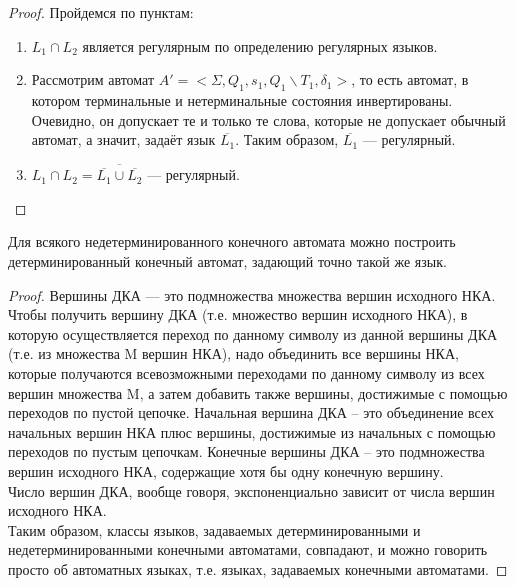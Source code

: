     \begin{proof}
        Пройдемся по пунктам:
        \begin{enumerate}
            \item $L_1 \cap L_2$ является регулярным по определению регулярных языков.
            \item Рассмотрим автомат $A' = <\Sigma, Q_1, s_1,Q_1 \backslash T_1,\delta_1>$, то есть автомат, в котором терминальные и нетерминальные состояния инвертированы. Очевидно, он допускает те и только те слова, которые не допускает обычный автомат, а значит, задаёт язык $\overline{L_1}$. Таким образом, $\overline{L_1}$ --- регулярный.
            \item $L_1 \cap L_2 = \overline{\overline{L_1} \cup \overline{L_2}}$ --- регулярный.
        \end{enumerate}
    \end{proof}


    \begin{Thm}
        Для всякого недетерминированного конечного автомата можно построить детерминированный конечный автомат, задающий точно такой же язык. 
    \end{Thm}
    \begin{proof}
        Вершины ДКА --- это подмножества множества вершин исходного НКА. Чтобы получить вершину ДКА (т.е. множество вершин исходного НКА), в которую осуществляется переход по данному символу из данной вершины ДКА (т.е. из множества M вершин НКА), надо объединить все вершины НКА, которые получаются всевозможными переходами по данному символу из всех вершин множества M, а затем добавить также вершины, достижимые с помощью переходов по пустой цепочке. Начальная вершина ДКА -- это объединение всех начальных вершин НКА плюс вершины, достижимые из начальных с помощью переходов по пустым цепочкам. Конечные вершины ДКА -- это подмножества вершин исходного НКА, содержащие хотя бы одну конечную вершину.\\
        Число вершин ДКА, вообще говоря, экспоненциально зависит от числа вершин исходного НКА.\\
        Таким образом, классы языков, задаваемых детерминированными и недетерминированными конечными автоматами, совпадают, и можно говорить просто об автоматных языках, т.е. языках, задаваемых конечными автоматами.
    \end{proof} 

    
